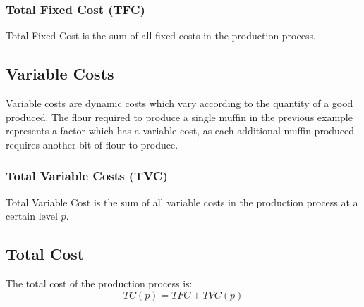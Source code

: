 \documentclass{article}
\begin{document}
\subsubsection{Total Fixed Cost (TFC)}
Total Fixed Cost is the sum of all fixed costs in the production process.

\subsection{Variable Costs}
Variable costs are dynamic costs which vary according to the quantity of a
good produced. The flour required to produce a single muffin in the previous
example represents a factor which has a variable cost, as each additional
muffin produced requires another bit of flour to produce.

\subsubsection{Total Variable Costs (TVC)}
Total Variable Cost is the sum of all variable costs in the production process
at a certain level \( p \).

\subsection{Total Cost}
The total cost of the production process is:
\[ TC(p) = TFC+TVC(p) \]
\end{document}
